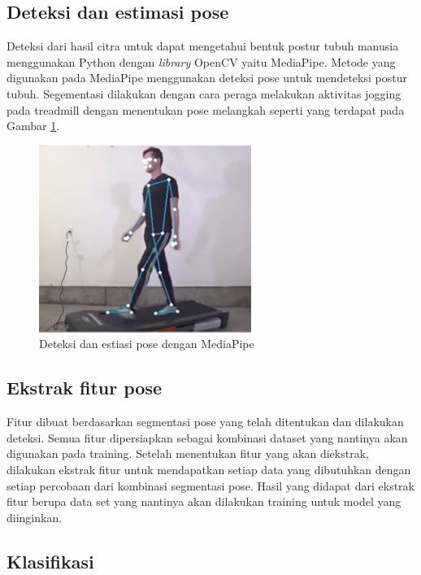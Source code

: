   \subsection{Deteksi dan estimasi pose}

  Deteksi dari hasil citra untuk dapat mengetahui bentuk postur tubuh manusia menggunakan Python dengan \emph{library} OpenCV yaitu MediaPipe. Metode yang digunakan pada MediaPipe menggunakan deteksi pose untuk mendeteksi postur tubuh. Segementasi dilakukan dengan cara peraga melakukan aktivitas jogging pada treadmill dengan menentukan pose melangkah seperti yang terdapat pada Gambar \ref{fig:DeteksiEstimasi}.

  \begin{figure} [ht] \centering
    \includegraphics[scale=1.1]{gambar/deteksi estimasi.png}
    \caption{Deteksi dan estiasi pose dengan MediaPipe}
    \label{fig:DeteksiEstimasi}
  \end{figure}

  \subsection{Ekstrak fitur pose}

  Fitur dibuat berdasarkan segmentasi pose yang telah ditentukan dan dilakukan deteksi. Semua fitur dipersiapkan sebagai kombinasi dataset yang nantinya akan digunakan pada training. Setelah menentukan fitur yang akan diekstrak, dilakukan ekstrak fitur untuk mendapatkan setiap data yang dibutuhkan dengan setiap percobaan dari kombinasi segmentasi pose. Hasil yang didapat dari ekstrak fitur berupa data set yang nantinya akan dilakukan training untuk model yang diinginkan.

  \subsection{Klasifikasi}

